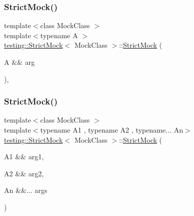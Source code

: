 \mbox{\label{classtesting_1_1_strict_mock_a868b6082e86b1961328f06421aab455f}} 
\subsubsection{\texorpdfstring{StrictMock()}{StrictMock()}\hspace{0.1cm}{\footnotesize\ttfamily [2/17]}}
{\footnotesize\ttfamily template$<$class Mock\+Class $>$ \\
template$<$typename A $>$ \\
\mbox{\hyperlink{classtesting_1_1_strict_mock}{testing\+::\+Strict\+Mock}}$<$ Mock\+Class $>$\+::\mbox{\hyperlink{classtesting_1_1_strict_mock}{Strict\+Mock}} (\begin{DoxyParamCaption}\item[{A \&\&}]{arg }\end{DoxyParamCaption})\hspace{0.3cm}{\ttfamily [inline]}, {\ttfamily [explicit]}}

\mbox{\label{classtesting_1_1_strict_mock_aec319a31bdd194d1ff9596a810cb9067}} 
\subsubsection{\texorpdfstring{StrictMock()}{StrictMock()}\hspace{0.1cm}{\footnotesize\ttfamily [3/17]}}
{\footnotesize\ttfamily template$<$class Mock\+Class $>$ \\
template$<$typename A1 , typename A2 , typename... An$>$ \\
\mbox{\hyperlink{classtesting_1_1_strict_mock}{testing\+::\+Strict\+Mock}}$<$ Mock\+Class $>$\+::\mbox{\hyperlink{classtesting_1_1_strict_mock}{Strict\+Mock}} (\begin{DoxyParamCaption}\item[{A1 \&\&}]{arg1,  }\item[{A2 \&\&}]{arg2,  }\item[{An \&\&...}]{args }\end{DoxyParamCaption})\hspace{0.3cm}{\ttfamily [inline]}}

